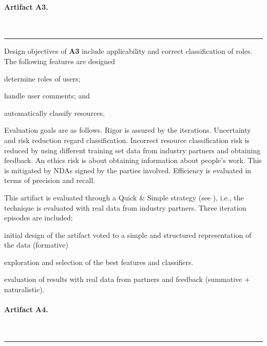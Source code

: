 \documentclass[a4paper,11pt]{article}
\begin{document}
\paragraph{Artifact A3.}
~\\\noindent\rule[1ex]{2.5cm}{2pt}

Design objectives of \textbf{A3} include applicability and correct classification of roles. The following features are designed 
	\begin{iiilist}
		\item determine roles of users;
		\item handle user comments; and
		\item automatically classify resources.
	\end{iiilist}
Evaluation goals are as follows. Rigor is assured by the iterations. Uncertainty and risk reduction regard classification. Incorrect resource classification risk is reduced by using different training set data from industry partners and obtaining feedback. An ethics risk is about obtaining information about people's work. This is mitigated by NDAs signed by the parties involved. Efficiency is evaluated in terms of precision and recall. 

This artifact is evaluated through a Quick \& Simple strategy (see \cite{Venable2016}), i.e., the technique is evaluated with real data from industry partners. Three iteration episodes are included: 
	\begin{iiilist}
		\item initial design of the artifact voted to a simple and structured representation of the data (formative)
		\item exploration and selection of the best features and classifiers.
		\item evaluation of results with real data from partners and feedback (summative + naturalistic).
	\end{iiilist}

\paragraph{Artifact A4.} 
~\\\noindent\rule[1ex]{2.5cm}{2pt}
\end{document}
